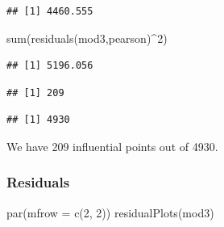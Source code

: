\documentclass[
  twoside]{article}
\newenvironment{Shaded}{\begin{snugshade}}{\end{snugshade}}
\newcommand{\AttributeTok}[1]{\textcolor[rgb]{0.77,0.63,0.00}{#1}}
\newcommand{\ConstantTok}[1]{\textcolor[rgb]{0.00,0.00,0.00}{#1}}
\newcommand{\DecValTok}[1]{\textcolor[rgb]{0.00,0.00,0.81}{#1}}
\newcommand{\FunctionTok}[1]{\textcolor[rgb]{0.00,0.00,0.00}{#1}}
\newcommand{\NormalTok}[1]{#1}
\newcommand{\OtherTok}[1]{\textcolor[rgb]{0.56,0.35,0.01}{#1}}
\newcommand{\SpecialCharTok}[1]{\textcolor[rgb]{0.00,0.00,0.00}{#1}}
\newcommand{\StringTok}[1]{\textcolor[rgb]{0.31,0.60,0.02}{#1}}
\begin{document}
\begin{verbatim}
## [1] 4460.555
\end{verbatim}

\begin{Shaded}
\begin{Highlighting}[]
\FunctionTok{sum}\NormalTok{(}\FunctionTok{residuals}\NormalTok{(mod3,}\StringTok{\textquotesingle{}pearson\textquotesingle{}}\NormalTok{)}\SpecialCharTok{\^{}}\DecValTok{2}\NormalTok{)}
\end{Highlighting}
\end{Shaded}

\begin{verbatim}
## [1] 5196.056
\end{verbatim}

\begin{Shaded}
\end{Shaded}

\begin{verbatim}
## [1] 209
\end{verbatim}

\begin{Shaded}
\end{Shaded}

\begin{verbatim}
## [1] 4930
\end{verbatim}

We have 209 influential points out of 4930.

\hypertarget{residuals}{%
\subsubsection{Residuals}\label{residuals}}

\begin{Shaded}
\begin{Highlighting}[]
\FunctionTok{par}\NormalTok{(}\AttributeTok{mfrow =} \FunctionTok{c}\NormalTok{(}\DecValTok{2}\NormalTok{, }\DecValTok{2}\NormalTok{))}
\FunctionTok{residualPlots}\NormalTok{(mod3)}
\end{Highlighting}
\end{Shaded}
\end{document}
